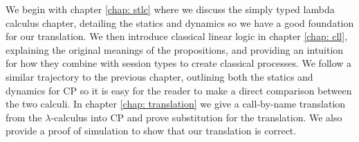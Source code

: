 \noindent
We begin with chapter \ref{chap: stlc} where we discuss the simply typed lambda calculus chapter, detailing the statics and 
dynamics so we have a good foundation for our translation. We then introduce classical linear logic in chapter \ref{chap: cll}, 
explaining the original meanings of the propositions, and providing an intuition for how they combine with session 
types to create classical processes. We follow a similar trajectory to the previous chapter, outlining both the 
statics and dynamics for CP so it is easy for the reader to make a direct comparison between the two calculi.
In chapter \ref{chap: translation} we give a call-by-name translation from the $\lambda$-calculus into CP and 
prove substitution for the translation. We also provide a proof of simulation to show that our translation is 
correct. 

